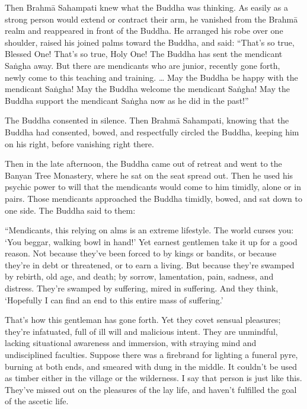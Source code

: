 \documentclass[12pt,openany]{book}%
\begin{document}
Then \textsanskrit{Brahmā} Sahampati knew what the Buddha was thinking. As easily as a strong person would extend or contract their arm, he vanished from the \textsanskrit{Brahmā} realm and reappeared in front of the Buddha. He arranged his robe over one shoulder, raised his joined palms toward the Buddha, and said: “That’s so true, Blessed One! That’s so true, Holy One! The Buddha has sent the mendicant \textsanskrit{Saṅgha} away. But there are mendicants who are junior, recently gone forth, newly come to this teaching and training. … May the Buddha be happy with the mendicant \textsanskrit{Saṅgha}! May the Buddha welcome the mendicant \textsanskrit{Saṅgha}! May the Buddha support the mendicant \textsanskrit{Saṅgha} now as he did in the past!” 

The Buddha consented in silence. Then \textsanskrit{Brahmā} Sahampati, knowing that the Buddha had consented, bowed, and respectfully circled the Buddha, keeping him on his right, before vanishing right there. 

Then in the late afternoon, the Buddha came out of retreat and went to the Banyan Tree Monastery, where he sat on the seat spread out. Then he used his psychic power to will that the mendicants would come to him timidly, alone or in pairs. Those mendicants approached the Buddha timidly, bowed, and sat down to one side. The Buddha said to them: 

“Mendicants, this relying on alms is an extreme lifestyle. The world curses you: ‘You beggar, walking bowl in hand!’ Yet earnest gentlemen take it up for a good reason. Not because they’ve been forced to by kings or bandits, or because they’re in debt or threatened, or to earn a living. But because they’re swamped by rebirth, old age, and death; by sorrow, lamentation, pain, sadness, and distress. They’re swamped by suffering, mired in suffering. And they think, ‘Hopefully I can find an end to this entire mass of suffering.’ 

That’s how this gentleman has gone forth. Yet they covet sensual pleasures; they’re infatuated, full of ill will and malicious intent. They are unmindful, lacking situational awareness and immersion, with straying mind and undisciplined faculties. Suppose there was a firebrand for lighting a funeral pyre, burning at both ends, and smeared with dung in the middle. It couldn’t be used as timber either in the village or the wilderness. I say that person is just like this. They’ve missed out on the pleasures of the lay life, and haven’t fulfilled the goal of the ascetic life. 
\end{document}

